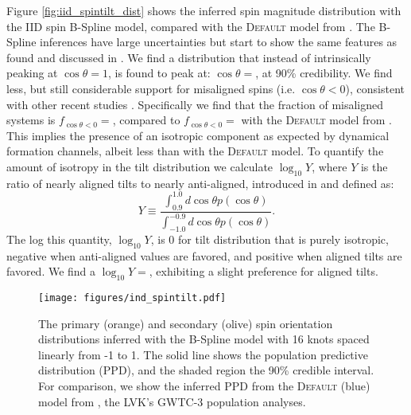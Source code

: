 Figure \ref{fig:iid_spintilt_dist} shows the inferred spin magnitude distribution with the IID spin B-Spline model, compared with the \textsc{Default} model from \citet{o3b_astro_dist}. 
The B-Spline inferences have large uncertainties but start to show the same features as found and discussed in \citet{spinitasyoulike}. 
We find a distribution that instead of intrinsically peaking at $\cos{\theta}=1$, is found to peak at: $\cos{\theta}=$\result{$\CIPlusMinus{\macros[BSplineIIDCompSpins][peakCosTilt]}$}, at 
90\% credibility. We find less, but still considerable support for misaligned spins (i.e. $\cos{\theta}<0$), consistent with other recent studies \citep{o3a_pop,o3b_astro_dist,Callister_NoEvidence}. Specifically we 
find that the fraction of misaligned systems is $f_{\cos{\theta}<0}=$\result{$\CIPlusMinus{\macros[BSplineIIDCompSpins][negFrac]}$}, compared to 
$f_{\cos{\theta}<0}=$\result{$\CIPlusMinus{\macros[Default][negFrac]}$} with the \textsc{Default} model from \citet{o3b_astro_dist}. This implies 
the presence of an isotropic component as expected by dynamical formation channels, albeit less than with the \textsc{Default} model. To quantify the 
amount of isotropy in the tilt distribution we calculate $\log_{10}Y$, where $Y$ is the ratio of nearly aligned tilts to nearly anti-aligned, 
introduced in \citet{spinitasyoulike} and defined as:
\begin{equation}
    Y \equiv \frac{\int_{0.9}^{1.0} d\cos{\theta} p(\cos{\theta})}{\int_{-1.0}^{-0.9} d\cos{\theta} p(\cos{\theta})}.
\end{equation}
The log this quantity, $\log_{10}Y$, is 0 for tilt distribution that is purely isotropic, negative when anti-aligned values are favored, 
and positive when aligned tilts are favored. We find a $\log_{10}Y=$, exhibiting a slight preference for aligned tilts.  

\begin{figure}[ht!]
    \begin{centering}
        \texttt{[image: figures/ind\_spintilt.pdf]}
        \caption{The primary (orange) and secondary (olive) spin orientation distributions inferred with the B-Spline model with 16 knots spaced linearly from -1 to 1. The solid line shows the population predictive distribution (PPD), and the shaded region the 90\% credible interval. 
        For comparison, we show the inferred PPD from the \textsc{Default} (blue) model from \citet{o3b_astro_dist}, the LVK's GWTC-3 population analyses.}
        \label{fig:ind_spintilt_dist}
    \end{centering}
\end{figure}

